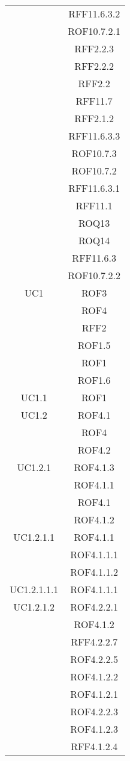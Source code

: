 \begin{longtable}{|c|c|}
& RFF11.6.3.2\\
& ROF10.7.2.1\\
& RFF2.2.3\\
& RFF2.2.2\\
& RFF2.2\\
& RFF11.7\\
& RFF2.1.2\\
& RFF11.6.3.3\\
& ROF10.7.3\\
& ROF10.7.2\\
& RFF11.6.3.1\\
& RFF11.1\\
& ROQ13\\
& ROQ14\\
& RFF11.6.3\\
& ROF10.7.2.2\\

\midrule
UC1
& ROF3\\
& ROF4\\
& RFF2\\
& ROF1.5\\
& ROF1\\
& ROF1.6\\

\midrule
UC1.1
& ROF1\\

\midrule
UC1.2
& ROF4.1\\
& ROF4\\
& ROF4.2\\

\midrule
UC1.2.1
& ROF4.1.3\\
& ROF4.1.1\\
& ROF4.1\\
& ROF4.1.2\\

\midrule
UC1.2.1.1
& ROF4.1.1\\
& ROF4.1.1.1\\
& ROF4.1.1.2\\

\midrule
UC1.2.1.1.1
& ROF4.1.1.1\\

\midrule
UC1.2.1.2
& ROF4.2.2.1\\
& ROF4.1.2\\
& RFF4.2.2.7\\
& ROF4.2.2.5\\
& ROF4.1.2.2\\
& ROF4.1.2.1\\
& ROF4.2.2.3\\
& ROF4.1.2.3\\
& RFF4.1.2.4\\


\end{longtable}
